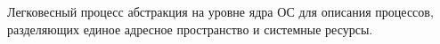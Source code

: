 \begin{defi}{Легковесный процесс}
	абстракция на уровне ядра ОС для описания процессов, разделяющих единое адресное пространство и системные ресурсы.
\end{defi}